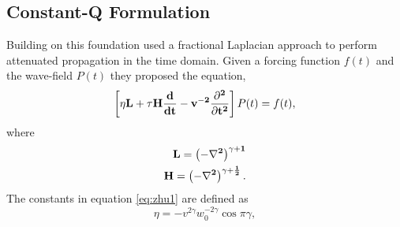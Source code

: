 \subsection{Constant-Q Formulation}
Building on this foundation \cite{zhu} used a fractional Laplacian approach to perform attenuated  propagation 
in the time domain. Given a forcing function $f(t)$ and the wave-field $P(t)$ they proposed the equation,
\begin{equation}
\left[ \eta \bf L + \tau \bf H \frac{d}{dt} - v^{-2} \frac{\partial^2}{\partial t^2}\right] P(t)=f(t) \label{eq:zhu1},
\end{equation}
where 
\begin{eqnarray}
\bf L = \left(-\nabla^2\right)^{\gamma+1} \\
\bf H = \left(-\nabla^2\right)^{\gamma+\frac{1}{2}}.
\end{eqnarray}
The constants in equation \ref{eq:zhu1} are defined as 
\begin{equation}
\eta=-v^{2\gamma}w_0^{-2\gamma} \cos \pi \gamma,
\end{equation}

